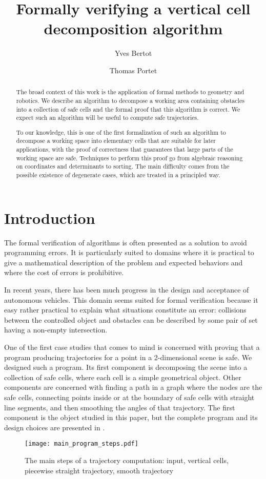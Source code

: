 \documentclass[a4paper, USenglish, cleveref, autoref, thm-restate, final]{lipics-v2021}
\title{Formally verifying a vertical cell decomposition algorithm}
\author{Yves Bertot}{Inria Center at Université Côte d'Azur, France}
       {yves.bertot@inria.fr}
       {https://orcid.org/0000-0001-5052-3019}{}
\author{Thomas Portet}{Inria Center at Université Côte d'Azur, France}
       {thomas.portet@inria.fr}
       {}{}
\begin{document}
\maketitle

\begin{abstract}
The broad context of this work is the application of formal methods to
geometry and robotics.
We describe an algorithm to decompose a working area
containing obstacles into a collection of safe cells and the formal
proof that this algorithm is correct.  We expect such an
algorithm will be useful to compute safe trajectories.

To our knowledge, this is one of the first formalization of such an
algorithm to decompose a working space into elementary cells that are
suitable for later applications, with the proof of correctness that
guarantees that large parts of the working space are safe.  Techniques
to perform this proof go from algebraic reasoning on coordinates and
determinants to sorting.  The main difficulty 
comes from the possible existence of degenerate cases, which are
treated in a principled way.
\end{abstract}

\section{Introduction}
The formal verification of algorithms is often presented as a solution
to avoid programming errors.  It is particularly suited to domains
where it is practical to give a mathematical description of the
problem and expected behaviors and where the cost of errors is
prohibitive.

In recent years, there has been much progress in the design and
acceptance of autonomous vehicles.
This domain seems suited for formal verification because it easy
rather practical to explain what situations constitute an error:
collisions between the controlled object and obstacles can be
described by some pair of set having a non-empty intersection.

One of the first case studies that comes to mind
is concerned with proving that a program producing trajectories for a
point in a 2-dimensional scene is safe.  We designed such a program.
Its first component is decomposing the scene into a collection of safe cells,
where each cell is a simple geometrical object.  Other components are
concerned with finding a path in a graph where the nodes are the safe
cells, connecting points inside or at the boundary of safe cells with
straight line segments, and then smoothing the angles of
that trajectory.  The first component is the
object studied in this paper, but the complete program and its
design choices are presented in \cite{bertot:hal-04312815}.
\begin{figure}
\begin{center}
\texttt{[image: main\_program\_steps.pdf]}
\end{center}
\caption{The main steps of a trajectory computation: input, 
  vertical cells, piecewise straight trajectory, smooth trajectory}
\end{figure}
\end{document}

